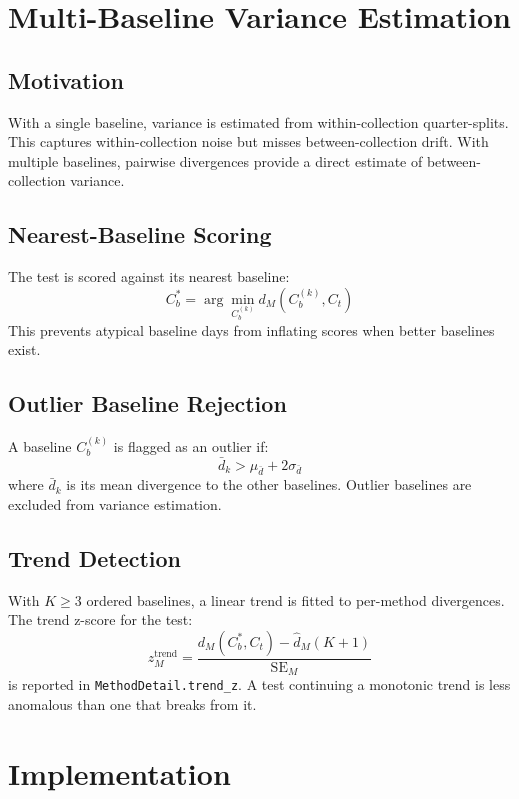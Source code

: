 \documentclass[10pt,twocolumn]{article}
\begin{document}
\section{Multi-Baseline Variance Estimation}
\label{sec:multibaseline}

\subsection{Motivation}

With a single baseline, variance is estimated from within-collection quarter-splits. This captures within-collection noise but misses between-collection drift. With multiple baselines, pairwise divergences provide a direct estimate of between-collection variance.

\subsection{Nearest-Baseline Scoring}

The test is scored against its nearest baseline:
\[
C_b^* = \arg\min_{C_b^{(k)}} d_M(C_b^{(k)}, C_t)
\]
This prevents atypical baseline days from inflating scores when better baselines exist.

\subsection{Outlier Baseline Rejection}

A baseline $C_b^{(k)}$ is flagged as an outlier if:
\[
\bar{d}_k > \mu_{\bar{d}} + 2\sigma_{\bar{d}}
\]
where $\bar{d}_k$ is its mean divergence to the other baselines. Outlier baselines are excluded from variance estimation.

\subsection{Trend Detection}

With $K \geq 3$ ordered baselines, a linear trend is fitted to per-method divergences. The trend z-score for the test:
\[
z_M^{\text{trend}} = \frac{d_M(C_b^*, C_t) - \hat{d}_M(K+1)}{\text{SE}_M}
\]
is reported in \texttt{MethodDetail.trend\_z}. A test continuing a monotonic trend is less anomalous than one that breaks from it.

\section{Implementation}
\end{document}
